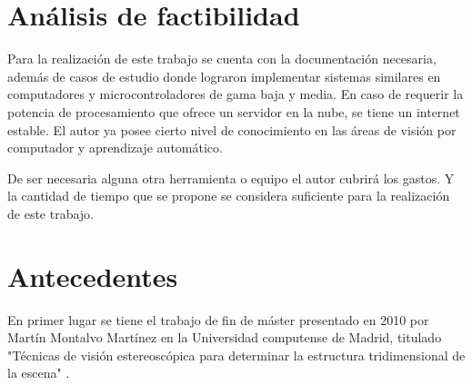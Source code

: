 \section{Análisis de factibilidad}
Para la realización de este trabajo se cuenta con la documentación necesaria, además de casos de estudio donde lograron implementar sistemas similares en computadores y microcontroladores de gama baja y media. En caso de requerir la potencia de procesamiento que ofrece un servidor en la nube, se tiene un internet estable. El autor ya posee cierto nivel de conocimiento en las áreas de visión por computador y aprendizaje automático.

De ser necesaria alguna otra herramienta o equipo el autor cubrirá los gastos. Y la cantidad de tiempo que se propone se considera suficiente para la realización de este trabajo.
\section{Antecedentes}
En primer lugar se tiene el trabajo de fin de máster presentado en 2010 por
Martín Montalvo Martínez en la Universidad computense de Madrid, titulado "Técnicas de visión estereoscópica para determinar la estructura tridimensional de la escena" \cite{MartinMM}.

